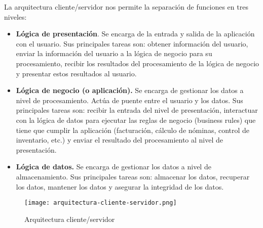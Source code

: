 La arquitectura cliente/servidor nos permite la separación de funciones en tres
niveles:

\begin{itemize}
\item \textbf{Lógica de presentación}. Se encarga de la entrada y salida de la aplicación con
el usuario. Sus principales tareas son: obtener información del usuario, enviar la
información del usuario a la lógica de negocio para su procesamiento, recibir los
resultados del procesamiento de la lógica de negocio y presentar estos resultados
al usuario.

\item \textbf{Lógica de negocio (o aplicación).} Se encarga de gestionar los datos a nivel
de procesamiento. Actúa de puente entre el usuario y los datos. Sus principales
tareas son: recibir la entrada del nivel de presentación, interactuar con la lógica
de datos para ejecutar las reglas de negocio (business rules) que tiene que cumplir la aplicación (facturación, cálculo de nóminas, control de inventario, etc.) y
enviar el resultado del procesamiento al nivel de presentación.


\item \textbf{Lógica de datos.} Se encarga de gestionar los datos a nivel de almacenamiento.
Sus principales tareas son: almacenar los datos, recuperar los datos, mantener
los datos y asegurar la integridad de los datos.
\end{itemize}	

\begin{figure}[H]
	\center
	\texttt{[image: arquitectura-cliente-servidor.png]}
	\caption{Arquitectura cliente/servidor}
	\label{fig:super}
\end{figure}

